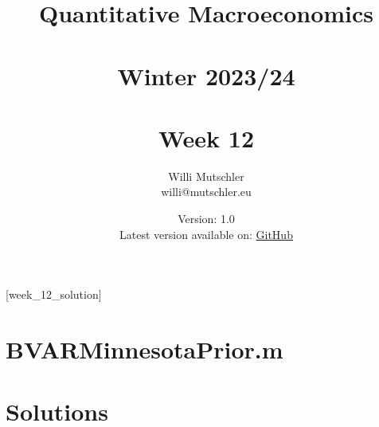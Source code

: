 
\newif\ifDisplaySolutions\DisplaySolutionstrue


\title{Quantitative Macroeconomics\\~\\Winter 2023/24\\~\\Week 12}
\author{Willi Mutschler\\willi@mutschler.eu}
\date{Version: 1.0\\Latest version available on: \href{https://github.com/wmutschl/Quantitative-Macroeconomics/releases/latest/download/week_12.pdf}{GitHub}}
\maketitle\thispagestyle{empty}

\newpage
{}[week_12_solution]
\tableofcontents\thispagestyle{empty}\newpage

\setcounter{page}{1}
\newpage
\newpage

\printbibliography
\newpage

\appendix
\section{BVARMinnesotaPrior.m}


\ifDisplaySolutions
\newpage

\section{Solutions}

\fi
